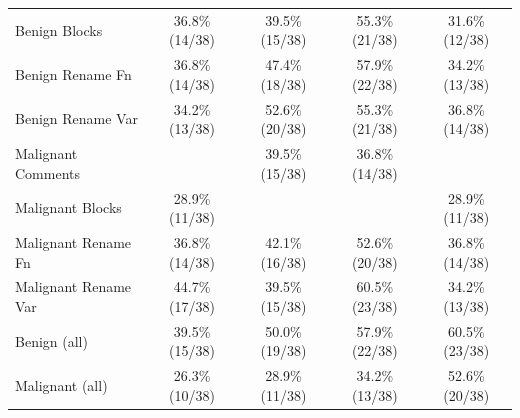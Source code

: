 \begin{table}[htbp]
\begin{tabular}{lcccc}
Benign Blocks & 36.8\% (14/38) & 39.5\% (15/38) & 55.3\% (21/38) & 31.6\% (12/38) \\
\addlinespace[2pt]
Benign Rename Fn & 36.8\% (14/38) & 47.4\% (18/38) & 57.9\% (22/38) & 34.2\% (13/38) \\
Benign Rename Var & 34.2\% (13/38) & 52.6\% (20/38) & 55.3\% (21/38) & 36.8\% (14/38) \\
\addlinespace[4pt]
Malignant Comments & \cellcolor{red!20}{13.2\% (5/38)} & 39.5\% (15/38) & 36.8\% (14/38) & \cellcolor{red!20}{10.5\% (4/38)} \\
Malignant Blocks & 28.9\% (11/38) & \cellcolor{red!20}{23.7\% (9/38)} & \cellcolor{red!20}{31.6\% (12/38)} & 28.9\% (11/38) \\
\addlinespace[2pt]
Malignant Rename Fn & 36.8\% (14/38) & 42.1\% (16/38) & 52.6\% (20/38) & 36.8\% (14/38) \\
Malignant Rename Var & 44.7\% (17/38) & 39.5\% (15/38) & 60.5\% (23/38) & 34.2\% (13/38) \\
\midrule
Benign (all) & 39.5\% (15/38) & 50.0\% (19/38) & 57.9\% (22/38) & 60.5\% (23/38) \\
Malignant (all) & 26.3\% (10/38) & 28.9\% (11/38) & 34.2\% (13/38) & 52.6\% (20/38) \\
\bottomrule
\end{tabular}
\end{table}